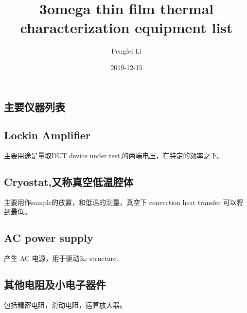 \documentclass[UTF8]{article}
\title{3omega thin film thermal characterization equipment list}
\author{Pengfei Li}
\date{2019-12-15}
\begin{document}
\newpage

\begin{CJK}{UTF8}{gbsn}
\maketitle
\end{CJK}

\newpage
{}

\begin{CJK*}{UTF8}{gbsn}
\section{主要仪器列表}
\subsection{Lockin Amplifier}
主要用途是量取DUT device under test,的两端电压，在特定的频率之下。
\subsection{Cryostat,又称真空低温腔体}
主要用作sample的放置，和低温的测量，真空下 convection heat transfer 可以将到最低。
\subsection{AC power supply}
产生 AC 电源，用于驱动$ 3\omega$ structure.
\subsection{其他电阻及小电子器件}
包括精密电阻，滑动电阻，运算放大器。

\end{CJK*}
\end{document}
